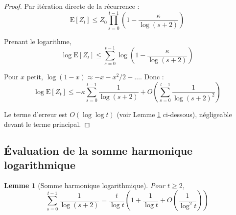 \documentclass[12pt,a4paper]{article}
\newtheorem{lemma}[theorem]{Lemme}
\theoremstyle{definition}
\theoremstyle{remark}
\newcommand{\E}{\text{E}}
\begin{document}
	\begin{proof}
		Par itération directe de la récurrence :
		\begin{equation}
			\E[Z_t] \leq Z_0 \prod_{s=0}^{t-1} \left(1 - \frac{\kappa}{\log(s+2)}\right)
		\end{equation}
		
		Prenant le logarithme,
		\begin{equation}
			\log \E[Z_t] \leq \sum_{s=0}^{t-1} \log\left(1 - \frac{\kappa}{\log(s+2)}\right)
		\end{equation}
		
		Pour $x$ petit, $\log(1-x) \approx -x - x^2/2 - \ldots$. Donc :
		\begin{equation}
			\log \E[Z_t] \leq -\kappa \sum_{s=0}^{t-1} \frac{1}{\log(s+2)} + O\left(\sum_{s=0}^{t-1} \frac{1}{\log(s+2)^2}\right)
		\end{equation}
		
		Le terme d'erreur est $O(\log\log t)$ (voir Lemme \ref{lem:sum-harmonic} ci-dessous), négligeable devant le terme principal.
	\end{proof}
	
	\subsection{Évaluation de la somme harmonique logarithmique }
	
	\begin{lemma}[Somme harmonique logarithmique]\label{lem:sum-harmonic}
		Pour $t \geq 2$,
		\begin{equation}
			\sum_{s=0}^{t-1} \frac{1}{\log(s+2)} = \frac{t}{\log t} \left(1 + \frac{1}{\log t} + O\left(\frac{1}{\log^2 t}\right)\right)
		\end{equation}
	\end{lemma}
	
\end{document}
